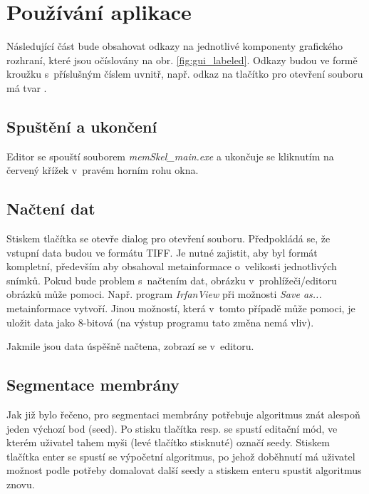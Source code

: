 \section{Používání aplikace}
Následující část bude obsahovat odkazy na jednotlivé komponenty grafického rozhraní, které jsou očíslovány na obr. \ref{fig:gui_labeled}. Odkazy budou ve formě kroužku s~příslušným číslem uvnitř, např. odkaz na tlačítko pro otevření souboru má tvar .

\subsection{Spuštění a ukončení}
Editor se spouští souborem \textit{memSkel\_main.exe } a ukončuje se kliknutím na červený křížek v~pravém horním rohu okna.

\subsection{Načtení dat}
Stiskem tlačítka  se otevře dialog pro otevření souboru. Předpokládá se, že vstupní data budou ve formátu TIFF. Je nutné zajistit, aby byl formát kompletní, především aby obsahoval metainformace o~velikosti jednotlivých snímků. Pokud bude problem s~načtením dat,  obrázku v~prohlížeči/editoru obrázků může pomoci. Např. program \textit{IrfanView} při možnosti \textit{Save as...} metainformace vytvoří. Jinou možností, která v~tomto případě může pomoci, je uložit data jako 8-bitová (na výstup programu tato změna nemá vliv).

Jakmile jsou data úspěšně načtena, zobrazí se v~editoru.

\subsection{Segmentace membrány}
Jak již bylo řečeno, pro segmentaci membrány potřebuje algoritmus znát alespoň jeden výchozí bod (seed). Po stisku tlačítka  resp.  se spustí editační mód, ve kterém uživatel tahem myši (levé tlačítko stisknuté) označí seedy. Stiskem tlačítka enter se spustí se výpočetní algoritmus, po jehož doběhnutí má uživatel možnost podle potřeby domalovat další seedy a stiskem enteru spustit algoritmus znovu.

